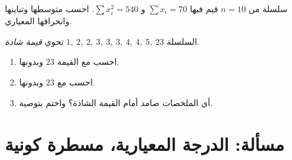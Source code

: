 \begin{exercise}[$\star\star$]\label{exo:g11:stat:9}
سلسلة من $n = 10$ قيم فيها $\sum x_i = 70$ و
$\sum x_i^2 = 540$. احسب متوسطها وتباينها وانحرافها المعياري.
\end{exercise}

\begin{exercise}[$\star\star\star$]\label{exo:g11:stat:10}
السلسلة $1,\ 2,\ 2,\ 3,\ 3,\ 3,\ 4,\ 4,\ 5,\ 23$ تحوي
\emph{قيمة شاذة}.
\begin{enumerate}
  \item احسب   مع القيمة $23$ وبدونها.
  \item احسب  مع $23$ وبدونها.
  \item أي الملخصات صامد أمام القيمة الشاذة؟ واختم بتوصية.
\end{enumerate}
\end{exercise}

\section{مسألة: الدرجة المعيارية، مسطرة كونية}

